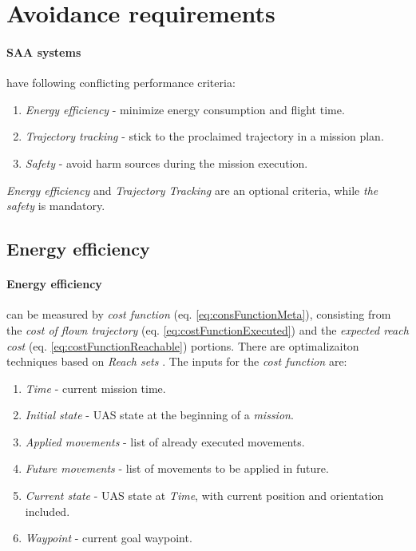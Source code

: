 \section{Avoidance requirements}\label{s:AvoidanceRequirements}

\paragraph{SAA systems} have following conflicting performance criteria:
\begin{enumerate}
    \item \emph{Energy efficiency} - minimize energy consumption and flight time.
    \item \emph{Trajectory tracking} - stick to the proclaimed trajectory in a mission plan.
    \item \emph{Safety} - avoid harm sources during the mission execution.
\end{enumerate}

\begin{note}
    \emph{Energy efficiency} and \emph{Trajectory Tracking} are an optional criteria, while \emph{the safety} is mandatory.
\end{note}

\subsection{Energy efficiency}\label{s:EnergyEfficiency}
\paragraph{Energy efficiency} can be measured by \emph{cost function} (eq. \ref{eq:consFunctionMeta}), consisting from the \emph{cost of flown trajectory} (eq. \ref{eq:costFunctionExecuted}) and the \emph{expected reach cost} (eq. \ref{eq:costFunctionReachable}) portions. There are optimalizaiton techniques based on \emph{Reach sets} \cite{kurzhanski2001dynamic}. The inputs for the \emph{cost function} are:
\begin{enumerate}
    \item \emph{Time} - current mission time.
    \item \emph{Initial state} - UAS state at the beginning of a \emph{mission}.
    \item \emph{Applied movements} - list of already executed movements.
    \item  \emph{Future movements} - list of movements to be applied in future.
    \item \emph{Current state} - UAS state at \emph{Time}, with current position and orientation included.
    \item \emph{Waypoint} - current goal waypoint.
\end{enumerate}


